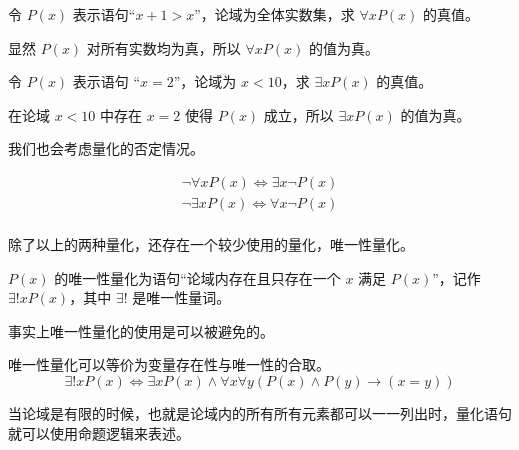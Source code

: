 \begin{collections}
    \begin{example}
        令 $P(x)$ 表示语句“$x + 1 > x$”，论域为全体实数集，求 $\forall x P(x)$ 的真值。
    \end{example}
    \begin{solution}
        显然 $P(x)$ 对所有实数均为真，所以 $\forall x P(x)$ 的值为真。
    \end{solution}

    \spare

    \begin{example}
        令 $P(x)$ 表示语句 “$x = 2$”，论域为 $x < 10$，求 $\exists x P(x)$ 的真值。
    \end{example}
    \begin{solution}
        在论域 $x < 10$ 中存在 $x = 2$ 使得 $P(x)$ 成立，所以 $\exists x P(x)$ 的值为真。
    \end{solution}
\end{collections}

我们也会考虑量化的否定情况。
\begin{theorem}
    \begin{equation*}
        \begin{gathered}
            \lnot \forall x P(x) \iff \exists x \lnot P(x) \\
            \lnot \exists x P(x) \iff \forall x \lnot P(x) \\
        \end{gathered}
    \end{equation*}
\end{theorem}

除了以上的两种量化，还存在一个较少使用的量化，唯一性量化。
\begin{definition}[唯一性量化]\label{def:唯一性量化}
    $P(x)$ 的唯一性量化为语句“论域内存在且只存在一个 $x$ 满足 $P(x)$”，记作 $\exists ! x P(x)$，其中 $\exists !$ 是唯一性量词。
\end{definition}

事实上唯一性量化的使用是可以被避免的。
\begin{theorem}[唯一性量化的等价形式]
    唯一性量化可以等价为变量存在性与唯一性的合取。
    \begin{equation*}
        \exists ! x P(x) \iff \exists x P(x) \land \forall x \forall y(P(x) \land P(y) \to (x = y))
    \end{equation*}
\end{theorem}

当论域是有限的时候，也就是论域内的所有所有元素都可以一一列出时，量化语句就可以使用命题逻辑来表述。

